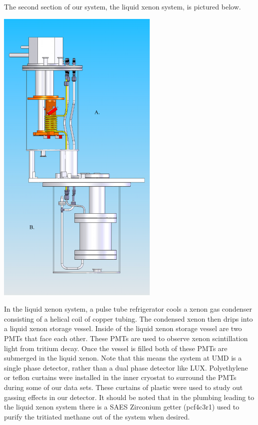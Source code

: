 \documentclass[a4paper,12pt]{article}
\begin{document}
The second section of our system, the liquid xenon system, is pictured below.

\begin{center}
\includegraphics[scale=0.75]{cryo.png}
\end{center}

In the liquid xenon system, a pulse tube refrigerator cools a xenon gas condenser consisting of a helical coil of copper tubing.  The condensed xenon then drips into a liquid xenon storage vessel.  Inside of the liquid xenon storage vessel are two PMTs that face each other. These PMTs are used to observe xenon scintillation light from tritium decay. Once the vessel is filled both of these PMTs are submerged in the liquid xenon.  Note that this means the system at UMD is a single phase detector, rather than a dual phase detector like LUX.  Polyethylene or teflon curtains were installed in the inner cryostat to surround the PMTs during some of our data sets.  These curtains of plastic were used to study out gassing effects in our detector.  It should be noted that in the plumbing leading to the liquid xenon system there is a SAES Zirconium getter (pcf4c3r1) used to purify the tritiated methane out of the system when desired.
\end{document}
